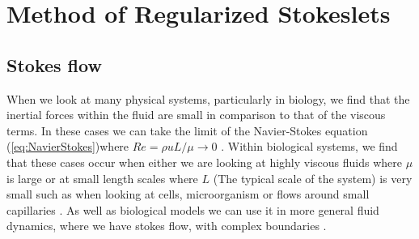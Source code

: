 \section{Method of Regularized Stokeslets}
\subsection{Stokes flow}
When we look at many physical systems, particularly in biology, we find that the inertial forces within the fluid are small in comparison to that of the viscous terms. In these cases we can take the limit of the Navier-Stokes equation (\cref{eq:NavierStokes})where $R e=\rho u L/\mu \to 0 $ \cite{Trombley2019BasicFlows}. Within biological systems, we find that these cases occur when either we are looking at highly viscous fluids where $\mu$ is large or at small length scales where $L$ (The typical scale of the system) is very small such as when looking at cells, microorganism or flows around small capillaries \cite{Blake1972AOrganisms, Higdon1979APropulsion, Smith2009MathematicalFluids}. As well as biological models we can use it in more general fluid dynamics, where we have stokes flow, with complex boundaries \cite{Liron1978StokesPipe, Liron1976StokesPlates}.

